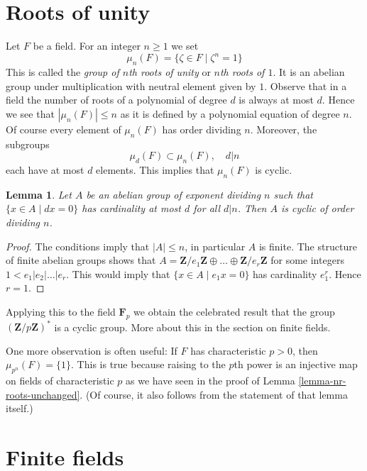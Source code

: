 \documentclass{stacks-project}
\theoremstyle{plain}
\newtheorem{lemma}[subsection]{Lemma}
\theoremstyle{definition}
\theoremstyle{remark}
\numberwithin{equation}{subsection}
\begin{document}
\section{Roots of unity}
\label{section-roots-of-1}

\noindent
Let $F$ be a field. For an integer $n \geq 1$ we set
$$
\mu_n(F) = \{\zeta \in F \mid \zeta^n = 1\}
$$
This is called the {\it group of $n$th roots of unity} or
{\it $n$th roots of $1$}. It is an abelian group under multiplication
with neutral element given by $1$.
Observe that in a field the number of roots of a polynomial of degree $d$
is always at most $d$. Hence we see that $|\mu_n(F)| \leq n$
as it is defined by a polynomial equation of degree $n$.
Of course every element of $\mu_n(F)$ has order dividing $n$.
Moreover, the subgroups
$$
\mu_d(F) \subset \mu_n(F),\quad d | n
$$
each have at most $d$ elements. This implies that $\mu_n(F)$ is cyclic.

\begin{lemma}
\label{lemma-cyclic}
Let $A$ be an abelian group of exponent dividing $n$ such that
$\{x \in A \mid dx = 0\}$ has cardinality at most $d$ for all $d | n$.
Then $A$ is cyclic of order dividing $n$.
\end{lemma}

\begin{proof}
The conditions imply that $|A| \leq n$, in particular $A$ is finite.
The structure of finite abelian groups shows that
$A = \mathbf{Z}/e_1\mathbf{Z} \oplus \ldots \oplus \mathbf{Z}/e_r\mathbf{Z}$
for some integers $1 < e_1 | e_2 | \ldots | e_r$. This would imply
that $\{x \in A \mid e_1 x = 0\}$ has cardinality $e_1^r$. Hence
$r = 1$.
\end{proof}

\noindent
Applying this to the field $\mathbf{F}_p$ we obtain the celebrated result
that the group $(\mathbf{Z}/p\mathbf{Z})^*$ is a cyclic group. More about
this in the section on finite fields.

\medskip\noindent
One more observation is often useful: If $F$ has characteristic
$p > 0$, then $\mu_{p^n}(F) = \{1\}$. This is true because raising
to the $p$th power is an injective map on fields of characteristic $p$
as we have seen in the proof of Lemma \ref{lemma-nr-roots-unchanged}.
(Of course, it also follows from the statement of that lemma itself.)






\section{Finite fields}
\label{section-finite}
\end{document}
